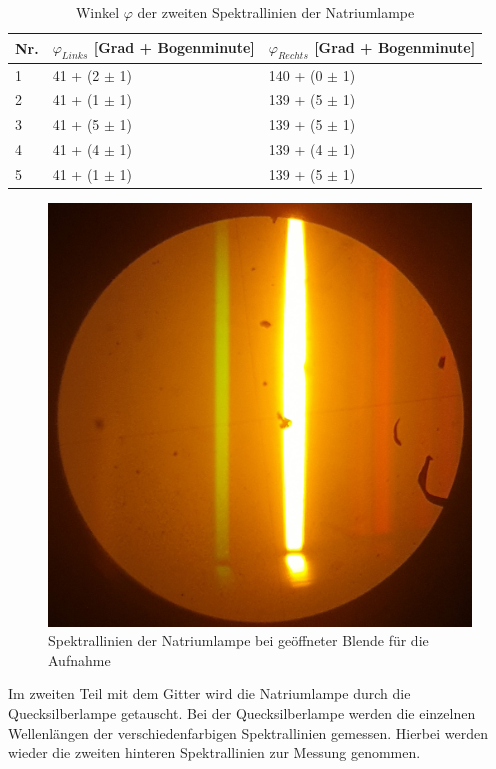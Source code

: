 \documentclass[12pt,a4paper,twoside]{article}
\begin{document}
\begin{table}[H]
    \centering
    \caption{Winkel $\varphi$ der zweiten Spektrallinien der Natriumlampe}
    \label{tab:Gitter v1}
    \begin{tabular}{| l | l | l |}
        \hline
        Nr.  & $\varphi_{Links}$ [Grad + Bogenminute]  & $\varphi_{Rechts}$ [Grad + Bogenminute]\\
        \hline
        1 & 41 + (2 $\pm$ 1) & 140 + (0 $\pm$ 1) \\
        2 & 41 + (1 $\pm$ 1) & 139 + (5 $\pm$ 1) \\
        3 & 41 + (5 $\pm$ 1) & 139 + (5 $\pm$ 1) \\
        4 & 41 + (4 $\pm$ 1) & 139 + (4 $\pm$ 1) \\
        5 & 41 + (1 $\pm$ 1) & 139 + (5 $\pm$ 1) \\
        \hline
    \end{tabular}
\end{table}

\begin{figure}[H]
    \centering
    \includegraphics[width=0.6\linewidth]{nudes/na-lampe1.jpg}
    \caption{Spektrallinien der Natriumlampe bei geöffneter Blende für die Aufnahme}
    \label{fig:spektallinienNA}
\end{figure}

\noindent
Im zweiten Teil mit dem Gitter wird die Natriumlampe durch die Quecksilberlampe getauscht. 
Bei der Quecksilberlampe werden die einzelnen Wellenlängen der verschiedenfarbigen Spektrallinien gemessen. Hierbei werden wieder die zweiten hinteren Spektrallinien zur Messung genommen. 
\end{document}
